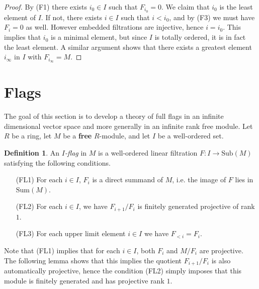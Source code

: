 \documentclass[oneside,11pt]{amsart}
\newcommand{\Sum}{\ensuremath{\text{Sum}}}
\newcommand{\Sub}{\ensuremath{\text{Sub}}}
\theoremstyle{definition}
\newtheorem{definition}{Definition}
\newtheorem{proof techniques}{Proof Techniques}
\begin{document}
\begin{proof}
By (F1) there exists $i_0 \in I$ such that $F_{i_0} = 0$. We claim that $i_0$ is the least element of $I$. If not, there exists $i \in I$ such that $i < i_0$, and by (F3) we must have $F_i = 0$ as well. However embedded filtrations are injective, hence $i = i_0$. This implies that $i_0$ is a minimal element, but since $I$ is totally ordered, it is in fact the least element. A similar argument shows that there exists a greatest element $i_\infty$ in $I$ with $F_{i_\infty} = M$. 
\end{proof}


\section{Flags}\label{sec: flags}


The goal of this section is to develop a theory of full flags in an infinite dimensional vector space and more generally in an infinite rank free module. Let $R$ be a ring, let $M$ be a \textbf{free} $R$-module, and let $I$ be a well-ordered set.

\begin{definition}
An \emph{$I$-flag} in $M$ is a well-ordered linear filtration $F : I \to \Sub(M)$ satisfying the following conditions. 

\begin{enumerate}

\item[(FL1)] For each $i \in I$, $F_i$ is a direct summand of $M$, i.e. the image of $F$ lies in $\Sum(M)$. 

\item[(FL2)] For each $i \in I$, we have $F_{i + 1} / F_i$ is finitely generated projective of rank $1$. 

\item[(FL3)] For each upper limit element $i \in I$ we have $F_{<i} = F_i$.

\end{enumerate}
\end{definition}

Note that (FL1) implies that for each $i \in I$, both $F_i$ and $M / F_i$ are projective. The following lemma shows that this implies the quotient $F_{i +1} / F_i$ is also automatically projective, hence the condition (FL2) simply imposes that this module is finitely generated and has projective rank $1$. 
\end{document}
